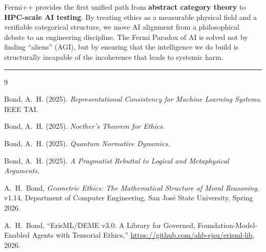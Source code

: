 \documentclass[12pt]{article}
\begin{document}
Fermi++ provides the first unified path from \textbf{abstract category theory} to \textbf{HPC-scale AI testing}. By treating ethics as a measurable physical field and a verifiable categorical structure, we move AI alignment from a philosophical debate to an engineering discipline. The Fermi Paradox of AI is solved not by finding ``aliens'' (AGI), but by ensuring that the intelligence we do build is structurally incapable of the incoherence that leads to systemic harm.

\bigskip
\hrule
\bigskip

\begin{thebibliography}{9}

Bond, A.~H. (2025).
\textit{Representational Consistency for Machine Learning Systems}.
IEEE TAI.

Bond, A.~H. (2025).
\textit{Noether's Theorem for Ethics}.

Bond, A.~H. (2025).
\textit{Quantum Normative Dynamics}.

Bond, A.~H. (2025).
\textit{A Pragmatist Rebuttal to Logical and Metaphysical Arguments}.

A.~H.~Bond, \emph{Geometric Ethics: The Mathematical Structure of Moral Reasoning}, v1.14, Department of Computer Engineering, San Jos\'e State University, Spring 2026.

A.~H.~Bond, ``ErisML/DEME v3.0: A Library for Governed, Foundation-Model-Enabled Agents with Tensorial Ethics,'' \url{https://github.com/ahb-sjsu/erisml-lib}, 2026.

\end{thebibliography}
\end{document}

